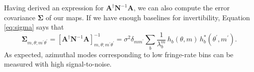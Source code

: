 \documentclass[twocolumn,apj,numberedappendix]{emulateapj}
\newcommand{\vis}{\mathbf{v}}
\newcommand{\x}{\mathbf{x}}
\newcommand{\A}{\mathbf{A}}
\newcommand{\N}{\mathbf{N}}
\begin{document}
Having derived an expression for $\A^\dagger \N^{-1} \A$, we can also compute
the error covariance $\boldsymbol \Sigma$ of our maps.  If we have enough
baselines for invertibility, Equation \eqref{eq:sigma} says that
\begin{equation}
\boldsymbol \Sigma_{m, \theta ; m^\prime \theta^\prime} = \left[ \A^\dagger \N^{-1} \A \right]^{-1}_{m, \theta ; m^\prime \theta^\prime} =  \sigma^2 \delta_{m m^\prime} \sum_b \frac{1}{\lambda_b^m} \, h_b(\theta, m) \, h_{b}^*(\theta^\prime, m^\prime).
\end{equation} 
As expected, azimuthal modes corresponding to low fringe-rate bins can be
measured with high signal-to-noise.
%
%
\end{document}
